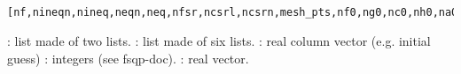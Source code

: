 
\begin{mandesc}
  \\ %
\end{mandesc}
\begin{calling_sequence}
\begin{verbatim}
  [nf,nineqn,nineq,neqn,neq,nfsr,ncsrl,ncsrn,mesh_pts,nf0,ng0,nc0,nh0,na0]=findparam(list_obj,list_cntr,x0)  
\end{verbatim}
\end{calling_sequence}

\begin{parameters}
  \begin{varlist}
    : list made of two lists.
    : list made of six lists.
    : real column vector (e.g. initial guess)
    : integers (see fsqp-doc).
    : real vector.
  \end{varlist}
\end{parameters}

